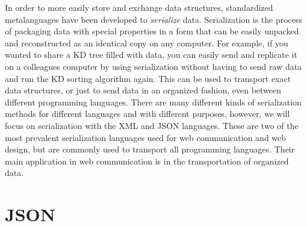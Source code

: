 \label{lab:webtech}

In order to more easily store and exchange data structures, standardized metalanguages have been developed to \emph{serialize} data.
Serialization is the process of packaging data with special properties in a form that can be easily unpacked and reconstructed as an identical copy on any computer.
For example, if you wanted to share a KD tree filled with data, you can easily send and replicate it on a colleagues computer by using serialization without having to send raw data and run the KD sorting algorithm again.
This can be used to transport exact data structures, or just to send data in an organized fashion, even between different programming languages.
There are many different kinds of serialization methods for different languages and with different purposes, however, we will focus on serialization with the XML and JSON languages.
These are two of the most prevalent serialization languages used for web communication and web design, but are commonly used to transport all programming languages.
Their main application in web communication is in the transportation of organized data.

\begin{comment}
In order for computers to communicate one with another, they need standardized ways of storing structured data.
For example, suppose you have a python list that you want to send to somebody else. How would you store it outside of the interpreter?
However we choose to store our list, we need to be able to load it back into the Python interpreter and use it as a list.
What if we wanted to store more complex objects?
The process of serialization seeks to address this situation.
Serialization is the process of storing an object and its properties in a form that can be saved or transmitted and later reconstructed back into an identical copy of the original object.
\end{comment}

\section*{JSON} %

